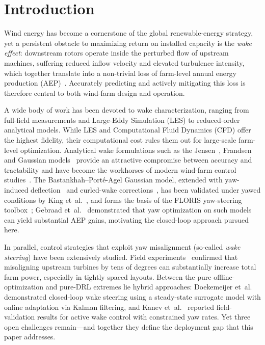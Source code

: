 \documentclass[final,5p,times]{elsarticle}
\begin{document}
\section{Introduction}\label{sec:intro}
Wind energy has become a cornerstone of the global renewable-energy strategy, yet a persistent obstacle to maximizing return on installed capacity is the \emph{wake effect}: downstream rotors operate inside the perturbed flow of upstream machines, suffering reduced inflow velocity and elevated turbulence intensity, which together translate into a non-trivial loss of farm-level annual energy production (AEP)~\citep{Barthelmie2009}. Accurately predicting and actively mitigating this loss is therefore central to both wind-farm design and operation.

A wide body of work has been devoted to wake characterization, ranging from full-field measurements and Large-Eddy Simulation (LES) to reduced-order analytical models. While LES and Computational Fluid Dynamics (CFD) offer the highest fidelity, their computational cost rules them out for large-scale farm-level optimization. Analytical wake formulations such as the Jensen~\citep{Jensen1983}, Frandsen~\citep{Frandsen2006} and Gaussian models~\citep{Bastankhah2014, Niayifar2016} provide an attractive compromise between accuracy and tractability and have become the workhorses of modern wind-farm control studies~\citep{Boersma2017,Andersson2021}. The Bastankhah--Port\'e-Agel Gaussian model, extended with yaw-induced deflection~\citep{BastankhahYaw2016} and curled-wake corrections~\citep{MartinezTossas2015}, has been validated under yawed conditions by King et~al.~\citep{King2021}, and forms the basis of the FLORIS yaw-steering toolbox~\citep{NRELFLORIS}; Gebraad et~al.~\citep{Gebraad2016} demonstrated that yaw optimization on such models can yield substantial AEP gains, motivating the closed-loop approach pursued here.

In parallel, control strategies that exploit yaw misalignment (so-called \emph{wake steering}) have been extensively studied. Field experiments~\citep{Fleming2017} confirmed that misaligning upstream turbines by tens of degrees can substantially increase total farm power, especially in tightly spaced layouts. Between the pure offline-optimization and pure-DRL extremes lie hybrid approaches: Doekemeijer et~al.~\citep{Doekemeijer2019} demonstrated closed-loop wake steering using a steady-state surrogate model with online adaptation via Kalman filtering, and Kanev et~al.~\citep{Kanev2020} reported field-validation results for active wake control with constrained yaw rates. Yet three open challenges remain---and together they define the deployment gap that this paper addresses.
\end{document}
